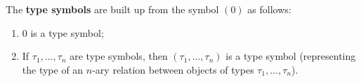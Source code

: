 The \textbf{type symbols} are built up from the symbol $(0)$ as follows:
\begin{enumerate}
\item[(1)] $0$ is a type symbol;
\item[(2)] If $\tau_1, \ldots, \tau_n$ are type symbols, then $(\tau_1, \ldots, \tau_n)$ is a type symbol (representing the type of an $n$-ary relation between objects of types $\tau_1, \ldots, \tau_n$).
\end{enumerate}
